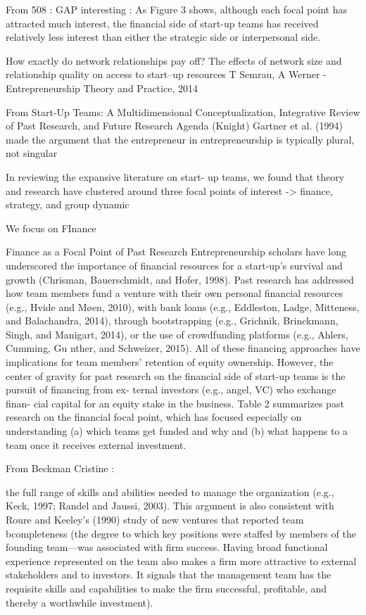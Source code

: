 \documentclass[11pt]{article}
\begin{document}
From 508 : GAP interesting : As Figure 3 shows, although each focal point has attracted much interest, the financial side of start-up teams has received relatively less interest than either the strategic side or interpersonal side.

How exactly do network relationships pay off? The effects of network size and relationship quality on access to start–up resources
T Semrau, A Werner - Entrepreneurship Theory and Practice, 2014

From Start-Up Teams: A Multidimensional Conceptualization, Integrative Review of Past Research, and Future Research Agenda (Knight)
Gartner et al. (1994) made the argument that the entrepreneur in entrepreneurship is typically plural, not singular

In reviewing the expansive literature on start- up teams, we found that theory and research have clustered around three focal points of interest -> finance, strategy, and group dynamic

We focus on FInance

Finance as a Focal Point of Past Research
Entrepreneurship scholars have long underscored the importance of financial resources for a start-up’s survival and growth (Chrisman, Bauerschmidt, and Hofer, 1998). Past research has addressed how team members fund a venture with their own personal financial resources (e.g., Hvide and Møen, 2010), with bank loans (e.g., Eddleston, Ladge, Mitteness, and Balachandra, 2014), through bootstrapping (e.g., Grichnik, Brinckmann, Singh, and Manigart, 2014), or the use of crowdfunding platforms (e.g., Ahlers, Cumming, Gu nther, and Schweizer, 2015). All of these financing approaches have implications for team members’ retention of equity ownership. However, the center of gravity for past research on the financial side of start-up teams is the pursuit of financing from ex- ternal investors (e.g., angel, VC) who exchange finan- cial capital for an equity stake in the business. Table 2 summarizes past research on the financial focal point, which has focused especially on understanding (a) which teams get funded and why and (b) what happens to a team once it receives external investment.

From Beckman Cristine :

the full range of skills and abilities needed to manage the organization (e.g., Keck, 1997; Randel and Jaussi, 2003). This argument is also consistent with Roure and Keeley’s (1990) study of new ventures that reported team bcompleteness (the degree to which key positions were staffed by members of the founding team—was associated with firm success. Having broad functional experience represented on the team also makes a firm more attractive to external stakeholders and to investors. It signals that the management team has the requisite skills and capabilities to make the firm successful, profitable, and thereby a worthwhile investment).
\end{document}
